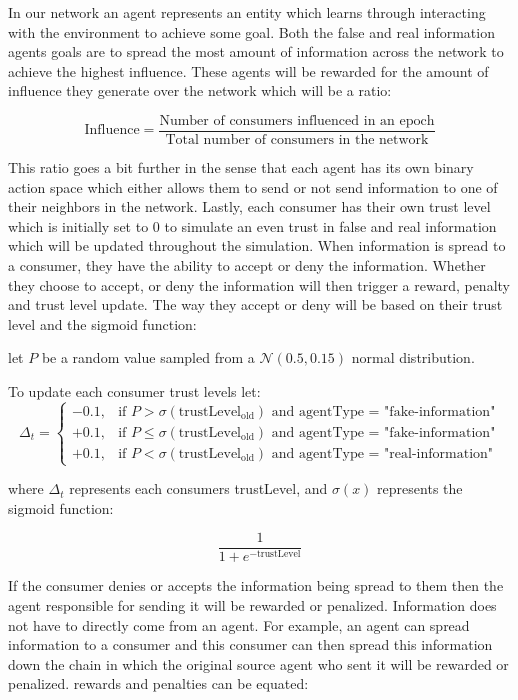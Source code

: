 \documentclass[twoside]{article}
\begin{document}
In our network an agent represents an entity which learns through interacting with the environment to achieve some goal. Both the false and real information agents goals are to spread the most amount of information across the network to achieve the highest influence. These agents will be rewarded for the amount of influence they generate over the network which will be a ratio:

\[
\text{Influence} = \frac{\text{Number of consumers influenced in an epoch}}{\text{Total number of consumers in the network}}
\]

This ratio goes a bit further in the sense that each agent has its own binary action space which either allows them to send or not send information to one of their neighbors in the network. Lastly, each consumer has their own trust level which is initially set to 0 to simulate an even trust in false and real information which will be updated throughout the simulation. When information is spread to a consumer, they have the ability to accept or deny the information. Whether they choose to accept, or deny the information will then trigger a reward, penalty and trust level update. The way they accept or deny will be based on their trust level and the sigmoid function:

let $P$ be a random value sampled from a $\mathcal{N}(0.5, 0.15)$ normal distribution.

To update each consumer trust levels let:
\[
\Delta_{t} = 
\begin{cases} 
-0.1, & \text{if } P > \sigma(\text{trustLevel}_{\text{old}}) \text{ and agentType = "fake-information"} \\
+0.1, & \text{if } P \leq \sigma(\text{trustLevel}_{\text{old}}) \text{ and agentType = "fake-information"}\\
+0.1, & \text{if } P < \sigma(\text{trustLevel}_{\text{old}}) \text{ and agentType = "real-information"}
\end{cases}
\]

where $\Delta_{t}$ represents each consumers trustLevel, and $\sigma(x)$ represents the sigmoid function:

\[
\frac{1}{1 + e^{-\text{trustLevel}}}
\]

If the consumer denies or accepts the information being spread to them then the agent responsible for sending it will be rewarded or penalized. Information does not have to directly come from an agent. For example, an agent can spread information to a consumer and this consumer can then spread this information down the chain in which the original source agent who sent it will be rewarded or penalized. rewards and penalties can be equated:
\end{document}
